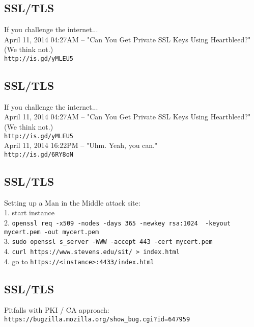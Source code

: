 \documentclass[xga]{xdvislides}
\begin{document}
\subsection{SSL/TLS}
If you challenge the internet... \\

April 11, 2014 04:27AM -- "Can You Get Private SSL Keys Using Heartbleed?"
(We think not.) \\
{\tt http://is.gd/yMLEU5} \\

\subsection{SSL/TLS}
If you challenge the internet... \\

April 11, 2014 04:27AM -- "Can You Get Private SSL Keys Using Heartbleed?"
(We think not.) \\
{\tt http://is.gd/yMLEU5} \\

April 11, 2014 16:22PM -- "Uhm. Yeah, you can." \\
{\tt http://is.gd/6RY8oN}


\subsection{SSL/TLS}
Setting up a Man in the Middle attack site: \\

1. start instance \\

2. {\tt openssl req -x509 -nodes -days 365 -newkey rsa:1024 \
        -keyout mycert.pem -out mycert.pem} \\

3. {\tt sudo openssl s\_server -WWW -accept 443 -cert mycert.pem} \\

4. {\tt curl https://www.stevens.edu/sit/ > index.html} \\

4. go to {\tt https://<instance>:4433/index.html} \\

\subsection{SSL/TLS}

Pitfalls with PKI / CA approach: \\
{\tt https://bugzilla.mozilla.org/show\_bug.cgi?id=647959} \\
\end{document}

